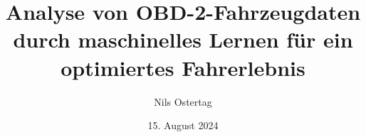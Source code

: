 \documentclass[oneside]{ausarbeitung}
\begin{document}


\Projektbericht

\MLD

\title{Analyse von OBD-2-Fahrzeugdaten durch maschinelles Lernen für ein optimiertes Fahrerlebnis}

\author{Nils Ostertag}

\examinerIsAProfessorfalse  %


\date{15. August 2024}



\maketitle
\cleardoublepage

\setcounter{page}{1}


\makeaffirmation
\cleardoublepage

\begin{abstract}
  
\end{abstract}
\cleardoublepage
\tableofcontents
\end{document}
